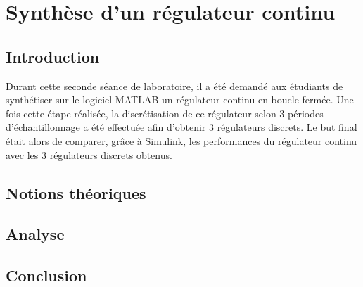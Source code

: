 \chapter{Synthèse d'un régulateur continu}

\section{Introduction}
Durant cette seconde séance de laboratoire, il a été demandé aux étudiants de synthétiser sur le logiciel MATLAB un régulateur continu en boucle fermée. Une fois cette étape réalisée, la discrétisation de ce régulateur selon 3 périodes d'échantillonnage a été effectuée afin d'obtenir 3 régulateurs discrets. Le but final était alors de comparer, grâce à Simulink, les performances du régulateur continu avec les 3 régulateurs discrets obtenus. 


\section{Notions théoriques}


\section{Analyse}


\section{Conclusion}

